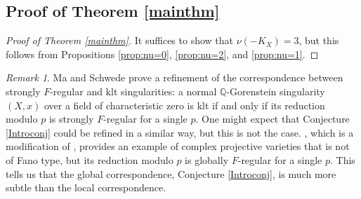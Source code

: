\documentclass[12pt]{amsart}
\newcommand{\Q}{\mathbb{Q}}
\theoremstyle{plain}
\theoremstyle{definition}
\theoremstyle{remark}
\newtheorem{rem}[thm]{Remark}
\newtheorem{defn and notation}[thm]{Definition and Notation}
\theoremstyle{plain}
\begin{document}
\subsection{Proof of Theorem \ref{mainthm}}

\begin{proof}[Proof of Theorem \ref{mainthm}]
    It suffices to show that $\nu(-K_X)=3$, but this follows from Propositions \ref{prop:nu=0}, \ref{prop:nu=2}, and \ref{prop:nu=1}.
\end{proof}

\begin{rem}
Ma and Schwede \cite{MaS21} prove a refinement of the correspondence between strongly $F$-regular and klt singularities: a normal $\Q$-Gorenstein singularity $(X,x)$ over a field of characteristic zero is klt if and only if its reduction modulo $p$ is strongly $F$-regular for a single $p$. 
One might expect that Conjecture \ref{Introconj} could be refined in a similar way, but this is not the case. 
\cite[Example 4.16]{Sato-Takagi21}, which is a modification of \cite[Theorem 1.1]{Singh99}, provides an example of complex projective varieties that is not of Fano type, but its reduction modulo $p$ is globally $F$-regular for a single $p$. 
This tells us that the global correspondence, Conjecture \ref{Introconj}, is much more subtle than the local correspondence. 
\end{rem}




\bigskip
\end{document}
